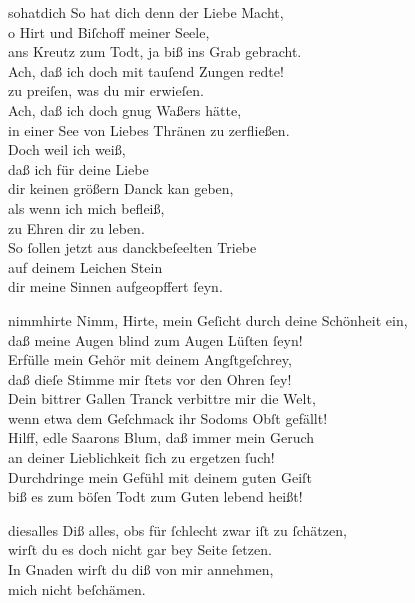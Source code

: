 \documentclass[tocstyle=ref-genre]{ees}
\begin{document}
{\clearpage
\begin{movement}{sohatdich}
  So hat dich denn der Liebe Macht,\\
  o Hirt und Biſchoff meiner Seele,\\
  ans Kreutz zum Todt, ja biß ins Grab gebracht.\\
  Ach, daß ich doch mit tauſend Zungen redte!\\
  zu preiſen, was du mir erwieſen.\\
  Ach, daß ich doch gnug Waßers hätte,\\
  in einer See von Liebes Thränen zu zerfließen.\\
  Doch weil ich weiß,\\
  daß ich für deine Liebe\\
  dir keinen größern Danck kan geben,\\
  als wenn ich mich befleiß,\\
  zu Ehren dir zu leben.\\
  So ſollen jetzt aus danckbeſeelten Triebe\\
  auf deinem Leichen Stein\\
  dir meine Sinnen aufgeopffert ſeyn.
\end{movement}

\begin{movement}{nimmhirte}
  \voice[Coro]
  Nimm, Hirte, mein Geſicht durch deine Schönheit ein,\\
  daß meine Augen blind zum Augen Lüſten ſeyn!\\
  Erfülle mein Gehör mit deinem Angſtgeſchrey,\\
  daß dieſe Stimme mir ſtets vor den Ohren ſey!\\
  Dein bittrer Gallen Tranck verbittre mir die Welt,\\
  wenn etwa dem Geſchmack ihr Sodoms Obſt gefällt!\\
  Hilff, edle Saarons Blum, daß immer mein Geruch\\
  an deiner Lieblichkeit ſich zu ergetzen ſuch!\\
  Durchdringe mein Gefühl mit deinem guten Geiſt\\
  biß es zum böſen Todt zum Guten lebend heißt!
\end{movement}

\begin{movement}{diesalles}
  \voice[Coro]
  Diß alles, obs für ſchlecht zwar iſt zu ſchätzen,\\
  wirſt du es doch nicht gar bey Seite ſetzen.\\
  In Gnaden wirſt du diß von mir annehmen,\\
  mich nicht beſchämen.


\end{movement}}
\end{document}
